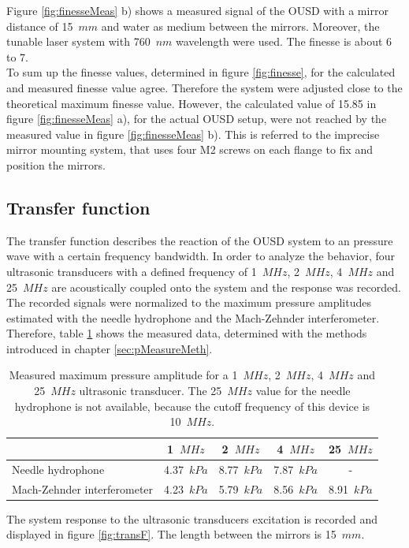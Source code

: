 Figure \ref{fig:finesseMeas} b) shows a measured signal of the OUSD with a mirror distance of 15~$mm$ and water as medium between the mirrors. Moreover, the tunable laser system with 760~$nm$ wavelength were used. The finesse is about 6 to 7.\\
To sum up the finesse values, determined in figure \ref{fig:finesse}, for the calculated and measured finesse value agree. Therefore the system were adjusted close to the theoretical maximum finesse value. However, the calculated value of 15.85 in figure \ref{fig:finesseMeas} a), for the actual OUSD setup, were not reached by the measured value in figure \ref{fig:finesseMeas} b). This is referred to the imprecise mirror mounting system, that uses four M2 screws on each flange to fix and position the mirrors.  

\subsection{Transfer function}
\label{sec:OUSDtf}

The transfer function describes the reaction of the OUSD system to an pressure wave with a certain frequency bandwidth. In order to analyze the behavior, four ultrasonic transducers with a defined frequency of 1~$MHz$, 2~$MHz$, 4~$MHz$ and 25~$MHz$ are acoustically coupled onto the system and the response was recorded.\\
The recorded signals were normalized to the maximum pressure amplitudes estimated with the needle hydrophone and the Mach-Zehnder interferometer. Therefore, table \ref{tab:pressureVal} shows the measured data, determined with the methods introduced in chapter \ref{sec:pMeasureMeth}.

\begin{table}[H]
	\centering
	\caption{Measured maximum pressure amplitude for a 1~$MHz$, 2~$MHz$, 4~$MHz$ and 25~$MHz$ ultrasonic transducer. The 25~$MHz$ value for the needle hydrophone is not available, because the cutoff frequency of this device is 10~$MHz$.}
	\begin{tabular}{| m{3cm} | c | c | c | c |}
		\hline
		\centering &1~$MHz$&2~$MHz$&4~$MHz$&25~$MHz$ \\ \hline
		\centering Needle hydrophone&4.37~$kPa$&8.77~$kPa$&7.87~$kPa$&-\\ \hline
		\centering Mach-Zehnder \newline interferometer&4.23~$kPa$&5.79~$kPa$&8.56~$kPa$&8.91~$kPa$\\ \hline
	\end{tabular}

	\label{tab:pressureVal}
\end{table}
The system response to the ultrasonic transducers excitation is recorded and displayed in figure \ref{fig:transF}. The length between the mirrors is 15~$mm$.

